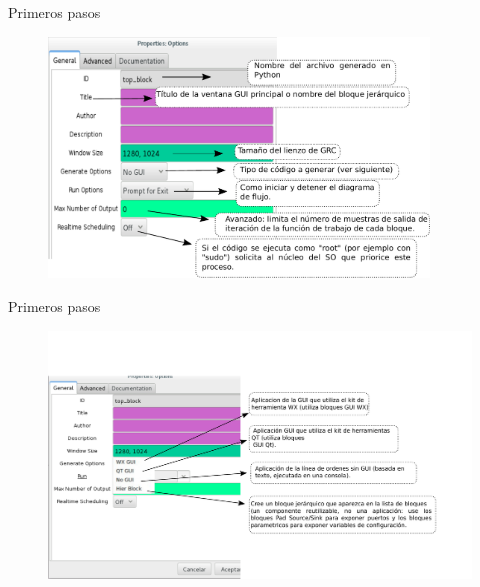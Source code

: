 \begin{frame}{Primeros pasos }
\begin{figure}[H]
\vspace{-3mm}
\centering
\includegraphics[width=0.9\textwidth]{parte1/lab1/pdf/lab1_4.pdf}
\end{figure}
\end{frame}

\begin{frame}{Primeros pasos }
\begin{figure}[H]
\vspace{-2cm}
\centering
\includegraphics[width=1.1\textwidth]{parte1/lab1/pdf/lab1_5.pdf}
\end{figure}
\end{frame}

